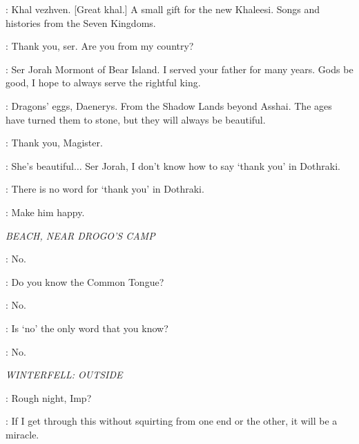 \JORAH: Khal vezhven. [Great khal.] A small gift for the new Khaleesi. Songs and histories from the Seven Kingdoms. 

\DAENERYS: Thank you, ser. Are you from my country? 

\JORAH: Ser Jorah Mormont of Bear Island. I served your father for many years. Gods be good, I hope to always serve the rightful king. 


\ILLYRIO: Dragons' eggs, Daenerys. From the Shadow Lands beyond Asshai. The ages have turned them to stone, but they will always be beautiful. 

\DAENERYS: Thank you, Magister. 


\DAENERYS: She's beautiful$\ldots$ Ser Jorah, I don't know how to say `thank you' in Dothraki. 

\JORAH: There is no word for `thank you' in Dothraki. 


\VISERYS: Make him happy. 


\scene

\textit{BEACH, NEAR DROGO'S CAMP} 


\DROGO: No. 

\DAENERYS: Do you know the Common Tongue? 

\DROGO: No. 

\DAENERYS: Is `no' the only word that you know? 

\DROGO: No. 



\scene

\textit{WINTERFELL: OUTSIDE} 


\HOUND: Rough night, Imp? 

\TYRION: If I get through this without squirting from one end or the other, it will be a miracle. 

